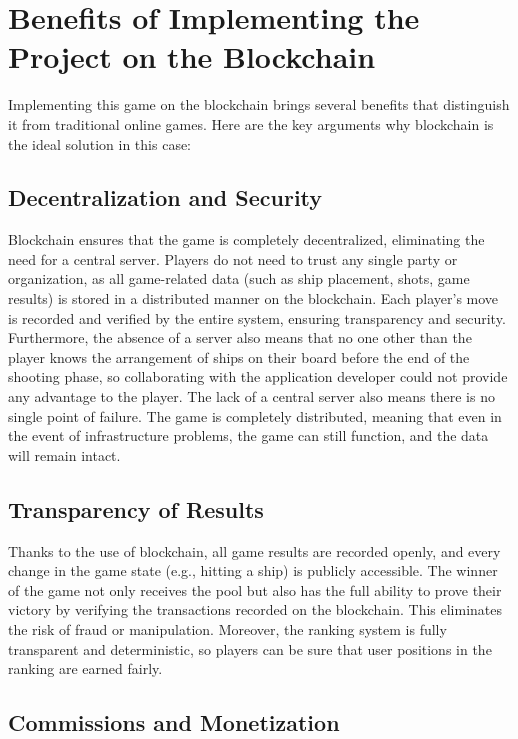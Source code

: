 \documentclass{article}
\begin{document}
\section{Benefits of Implementing the Project on the Blockchain}

Implementing this game on the blockchain brings several benefits that distinguish it from traditional online games. Here are the key arguments why blockchain is the ideal solution in this case:

\subsection{Decentralization and Security}

Blockchain ensures that the game is completely decentralized, eliminating the need for a central server. Players do not need to trust any single party or organization, as all game-related data (such as ship placement, shots, game results) is stored in a distributed manner on the blockchain. Each player's move is recorded and verified by the entire system, ensuring transparency and security. Furthermore, the absence of a server also means that no one other than the player knows the arrangement of ships on their board before the end of the shooting phase, so collaborating with the application developer could not provide any advantage to the player. The lack of a central server also means there is no single point of failure. The game is completely distributed, meaning that even in the event of infrastructure problems, the game can still function, and the data will remain intact.

\subsection{Transparency of Results}

Thanks to the use of blockchain, all game results are recorded openly, and every change in the game state (e.g., hitting a ship) is publicly accessible. The winner of the game not only receives the pool but also has the full ability to prove their victory by verifying the transactions recorded on the blockchain. This eliminates the risk of fraud or manipulation. Moreover, the ranking system is fully transparent and deterministic, so players can be sure that user positions in the ranking are earned fairly.

\subsection{Commissions and Monetization}
\end{document}
